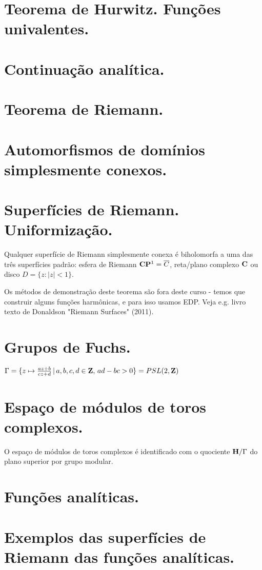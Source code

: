 \section{Teorema de Hurwitz. Funções univalentes.}

\section{Continuação analítica.}

\section{Teorema de Riemann.}

\section{Automorfismos de domínios simplesmente conexos.}

\section{Superfícies de Riemann. Uniformização.}

\begin{teorema}
Qualquer superfície de Riemann simplesmente conexa é biholomorfa a uma das três superfícies padrão:
esfera de Riemann $\mathbf{C}\mathbf{P}^1 = \overline{C}$, reta/plano complexo $\mathbf{C}$ ou disco $D = \{z : |z|<1\}$.
\end{teorema}
Os métodos de demonstração deste teorema são fora deste curso - temos que construir alguns funções
harmônicas, e para isso usamos EDP. Veja e.g. livro texto de Donaldson "Riemann Surfaces" (2011).

\section{Grupos de Fuchs.}

\begin{exem}
$\Gamma = \{ z \mapsto \frac{az+b}{cz+d} \,|\, a,b,c,d\in\mathbf{Z}, \, ad-bc>0 \} = PSL(2,\mathbf{Z})$
\end{exem}

\section{Espaço de módulos de toros complexos.}

\begin{teorema}
O espaço de módulos de toros complexos é identificado com o quociente $\mathbf{H}/\Gamma$
do plano superior por grupo modular.
\end{teorema}

\section{Funções analíticas.}

\section{Exemplos das superfícies de Riemann das funções analíticas.}

% 

